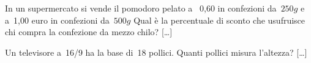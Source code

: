 \begin{multicols}{2}
% 

\begin{esercizio}
\label{ese:3.192}
In un supermercato si vende il pomodoro pelato a \officialeuro\ 0,60 in
confezioni da~$250\unit{g}$ e a~1,00 euro in confezioni da~$500\unit{g}$ 
Qual è la percentuale di sconto che usufruisce chi compra la confezione da 
mezzo chilo? \hfill [\dots]
\end{esercizio}


% 

\begin{esercizio}
\label{ese:3.196}
Un televisore a~16/9 ha la base di~18 pollici. Quanti
pollici misura l'altezza? \hfill [\dots]
\end{esercizio}


\end{multicols}
